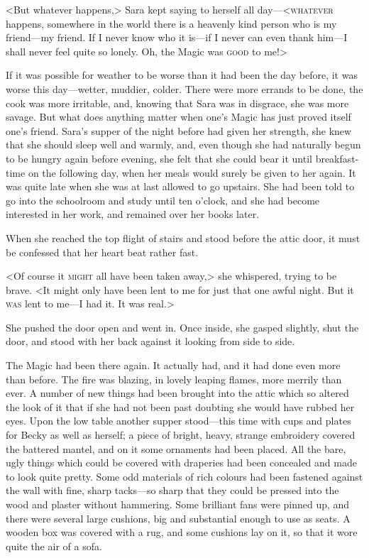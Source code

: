 <But whatever happens,> Sara kept saying to herself all day—<\textsc{whatever} happens, somewhere in the world there is a heavenly kind person who is my friend—my friend. If I never know who it is—if I never can even thank him—I shall never feel quite so lonely. Oh, the Magic was \textsc{good} to me!>

If it was possible for weather to be worse than it had been the day before, it was worse this day—wetter, muddier, colder. There were more errands to be done, the cook was more irritable, and, knowing that Sara was in disgrace, she was more savage. But what does anything matter when one's Magic has just proved itself one's friend. Sara's supper of the night before had given her strength, she knew that she should sleep well and warmly, and, even though she had naturally begun to be hungry again before evening, she felt that she could bear it until breakfast-time on the following day, when her meals would surely be given to her again. It was quite late when she was at last allowed to go upstairs. She had been told to go into the schoolroom and study until ten o'clock, and she had become interested in her work, and remained over her books later.

When she reached the top flight of stairs and stood before the attic door, it must be confessed that her heart beat rather fast.

<Of course it \textsc{might} all have been taken away,> she whispered, trying to be brave. <It might only have been lent to me for just that one awful night. But it \textsc{was} lent to me—I had it. It was real.>

She pushed the door open and went in. Once inside, she gasped slightly, shut the door, and stood with her back against it looking from side to side.

The Magic had been there again. It actually had, and it had done even more than before. The fire was blazing, in lovely leaping flames, more merrily than ever. A number of new things had been brought into the attic which so altered the look of it that if she had not been past doubting she would have rubbed her eyes. Upon the low table another supper stood—this time with cups and plates for Becky as well as herself; a piece of bright, heavy, strange embroidery covered the battered mantel, and on it some ornaments had been placed. All the bare, ugly things which could be covered with draperies had been concealed and made to look quite pretty. Some odd materials of rich colours had been fastened against the wall with fine, sharp tacks—so sharp that they could be pressed into the wood and plaster without hammering. Some brilliant fans were pinned up, and there were several large cushions, big and substantial enough to use as seats. A wooden box was covered with a rug, and some cushions lay on it, so that it wore quite the air of a sofa.


